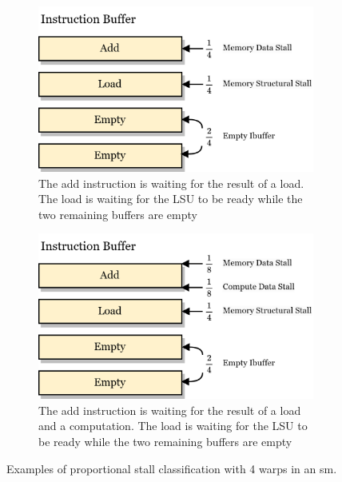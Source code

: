 \begin{figure}
     \centering
     \begin{subfigure}[t]{0.45\textwidth}
         \centering
         \includegraphics[width=\textwidth]{figures/proportional-stall-ex1.png}
         \caption{The add instruction is waiting for the result of a load. The load is waiting for the LSU to be ready while the two remaining buffers are empty}
         \label{fig:prop_stall_1}
     \end{subfigure}
     \hfill
     \begin{subfigure}[t]{0.45\textwidth}
         \centering
         \includegraphics[width=\textwidth]{figures/proportional-stall-ex2.png}
         \caption{The add instruction is waiting for the result of a load and a computation. The load is waiting for the LSU to be ready while the two remaining buffers are empty}
         \label{fig:prop_stall_2}
     \end{subfigure}
        \caption{Examples of proportional stall classification with 4 warps in an \acrshort{sm}.}
        \label{fig:lrr-gto}
\end{figure}

